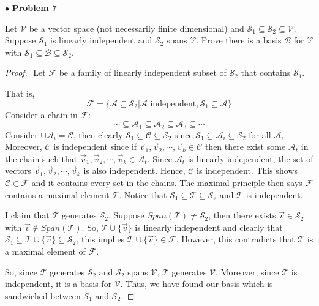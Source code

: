 \documentclass{article}
\begin{document}
\newpage
$ \bullet$ \textbf{Problem 7}
\medskip

\begin{itshape}
Let $\mathcal{V}$ be a vector space (not necessarily finite dimensional) and $\mathcal{S}_1 \subseteq \mathcal{S}_2 \subseteq \mathcal{V}$. Suppose $\mathcal{S}_1$ is linearly independent and $\mathcal{S}_2$ spans $\mathcal{V}$. Prove there is a basis $\mathcal{B}$ for $\mathcal{V}$ with $\mathcal{S}_1 \subseteq \mathcal{B} \subseteq \mathcal{S}_2$.
\end{itshape}
\medskip

\begin{proof}
$ $\newline
Let $\mathcal{F}$ be a family of linearly independent subset of $\mathcal{S}_2$ that contains $\mathcal{S}_1$. 

That is,
$$\mathcal{F} = \{ \mathcal{A} \subseteq \mathcal{S}_2 | \mathcal{A} \text{ independent}, \mathcal{S}_1 \subseteq \mathcal{A} \} $$
Consider a chain in $\mathcal{F}$: $$\cdots \subseteq \mathcal{A}_1  \subseteq \mathcal{A}_2 \subseteq \mathcal{A}_3 \subseteq \cdots$$
Consider $\cup \mathcal{A}_i =\mathcal{C}$, then clearly $\mathcal{S}_1 \subseteq \mathcal{C} \subseteq \mathcal{S}_2$ since $\mathcal{S}_1 \subseteq \mathcal{A}_i \subseteq \mathcal{S}_2$ for all $\mathcal{A}_i$. Moreover, $\mathcal{C}$ is independent since if $\vec{v}_1, \vec{v}_2, \cdots, \vec{v}_k \in \mathcal{C}$ then there exist some $\mathcal{A}_t$ in the chain such that $\vec{v}_1, \vec{v}_2, \cdots, \vec{v}_k \in \mathcal{A}_t$. Since $\mathcal{A}_t$ is linearly independent, the set of vectors $\vec{v}_1, \vec{v}_2, \cdots, \vec{v}_k$ is also independent. Hence, $\mathcal{C}$ is independent. This shows $\mathcal{C} \in \mathcal{F}$ and it contains every set in the chains. The maximal principle then says $\mathcal{F}$ contains a maximal element $\mathcal{T}$. Notice that $\mathcal{S}_1 \subseteq \mathcal{T} \subseteq \mathcal{S}_2$ and $\mathcal{T}$ is independent.

I claim that $\mathcal{T}$ generates $\mathcal{S}_2$.
Suppose $Span(\mathcal{T}) \ne \mathcal{S}_2$, then there exists $\vec{v} \in \mathcal{S}_2$ with $\vec{v} \notin Span(\mathcal{T})$. So, $\mathcal{T} \cup \{ \vec{v} \} $ is linearly independent and clearly that $\mathcal{S}_1 \subseteq \mathcal{T} \cup \{ \vec{v} \} \subseteq \mathcal{S}_2$, this implies $\mathcal{T} \cup \{ \vec{v} \} \in \mathcal{F}$. However, this contradicts that $\mathcal{T}$ is a maximal element of $\mathcal{F}$. 

So, since $\mathcal{T}$ generates $\mathcal{S}_2$ and $\mathcal{S}_2$ spans $\mathcal{V}$, $\mathcal{T}$ generates $\mathcal{V}$. Moreover, since $\mathcal{T}$ is independent, it is a basis for $\mathcal{V}$. Thus, we have found our basis which is sandwiched between $\mathcal{S}_1$ and $\mathcal{S}_2$.
\end{proof}
\end{document}
